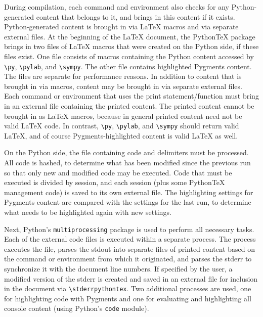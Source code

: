 \documentclass[letterpaper,compsoc,twoside]{IEEEtran}
\begin{document}
During compilation, each command and environment also checks for any Python-generated content that belongs to it, and brings in this content
if it exists.  Python-generated content is brought in via LaTeX macros
and via separate external files.  At the beginning of the LaTeX document,
the PythonTeX package brings in two files of LaTeX macros that were
created on the Python side, if these files exist.  One file consists
of macros containing the Python content accessed by \texttt{\textbackslash{}py}, \texttt{\textbackslash{}pylab},
and \texttt{\textbackslash{}sympy}.  The other file contains highlighted Pygments content.
The files are separate for performance reasons.  In addition to content
that is brought in via macros, content may be brought in via separate
external files.  Each command or environment that uses the print
statement/function must bring in an external file containing the
printed content.  The printed content cannot be brought in as LaTeX
macros, because in general printed content need not be valid LaTeX
code.  In contrast, \texttt{\textbackslash{}py}, \texttt{\textbackslash{}pylab}, and \texttt{\textbackslash{}sympy} should return valid
LaTeX, and of course Pygments-highlighted content is valid LaTeX
as well.

On the Python side, the file containing code and delimiters must be
processed.  All code is hashed, to determine what has been modified
since the previous run so that only new and modified code may be
executed.  Code that must be executed is divided by session, and each
session (plus some PythonTeX management code) is saved to its own
external file.  The highlighting settings for Pygments content are
compared with the settings for the last run, to determine what needs
to be highlighted again with new settings.

Next, Python's \texttt{multiprocessing} package is used to perform all
necessary tasks.  Each of the external code files is executed within
a separate process.  The process executes the file, parses the stdout
into separate files of printed content based on the command or
environment from which it originated, and parses the stderr to
synchronize it with the document line numbers.  If specified by the
user, a modified version of the stderr is created and saved in an
external file for inclusion in the document via \texttt{\textbackslash{}stderrpythontex}.
Two additional processes are used, one for highlighting code with
Pygments and one for evaluating and highlighting all console content
(using Python's \texttt{code} module).
\end{document}
